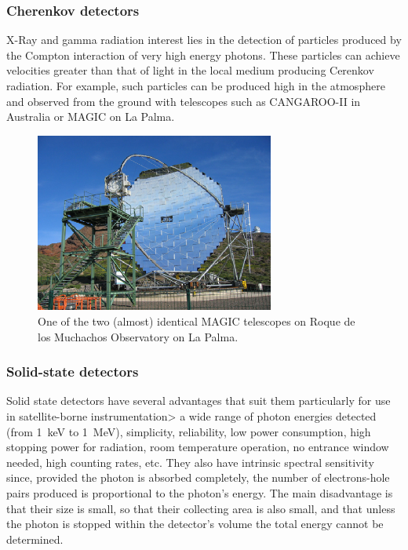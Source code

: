 \subsubsection{Cherenkov detectors}
X-Ray and gamma radiation interest lies in the detection
of particles produced by the Compton interaction of very high energy photons. These
particles can achieve velocities greater than that of light in the local medium producing
Cerenkov radiation. For example, such particles can be produced high in the atmosphere 
and observed from the ground with telescopes such as CANGAROO-II in Australia or 
MAGIC on La Palma.

\begin{figure}[h]
  \centering
	\includegraphics[width=0.7\textwidth]{magic.eps}
  \caption{One of the two (almost) identical MAGIC telescopes on Roque
    de los Muchachos Observatory on La Palma.}
  \label{fig:magic}
\end{figure}                    

\subsubsection{Solid-state detectors}
Solid state detectors have several advantages that suit them 
particularly for use in satellite-borne instrumentation> a wide range of photon energies
detected (from 1~keV to 1~MeV), simplicity, reliability, low power consumption, high
stopping power for radiation, room temperature operation, no entrance window needed,
high counting rates, etc. They also have intrinsic spectral sensitivity since, provided the 
photon is absorbed completely, the number of electrons-hole pairs produced is proportional
to the photon's energy. The main disadvantage is that their size is small, so that their 
collecting area is also small, and that unless the photon is stopped within the detector's
volume the total energy cannot be determined. 

